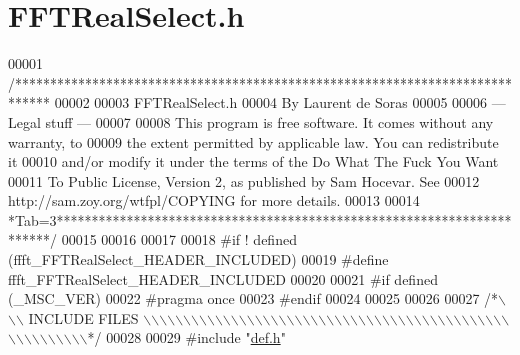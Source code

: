 \hypertarget{a00104_source}{\section{F\+F\+T\+Real\+Select.\+h}
\label{a00104_source}
}

\begin{DoxyCode}
00001 \textcolor{comment}{/*****************************************************************************}
00002 \textcolor{comment}{}
00003 \textcolor{comment}{        FFTRealSelect.h}
00004 \textcolor{comment}{        By Laurent de Soras}
00005 \textcolor{comment}{}
00006 \textcolor{comment}{--- Legal stuff ---}
00007 \textcolor{comment}{}
00008 \textcolor{comment}{This program is free software. It comes without any warranty, to}
00009 \textcolor{comment}{the extent permitted by applicable law. You can redistribute it}
00010 \textcolor{comment}{and/or modify it under the terms of the Do What The Fuck You Want}
00011 \textcolor{comment}{To Public License, Version 2, as published by Sam Hocevar. See}
00012 \textcolor{comment}{http://sam.zoy.org/wtfpl/COPYING for more details.}
00013 \textcolor{comment}{}
00014 \textcolor{comment}{*Tab=3***********************************************************************/}
00015 
00016 
00017 
00018 \textcolor{preprocessor}{#if ! defined (ffft\_FFTRealSelect\_HEADER\_INCLUDED)}
00019 \textcolor{preprocessor}{#define ffft\_FFTRealSelect\_HEADER\_INCLUDED}
00020 
00021 \textcolor{preprocessor}{#if defined (\_MSC\_VER)}
00022 \textcolor{preprocessor}{    #pragma once}
00023 \textcolor{preprocessor}{#endif}
00024 
00025 
00026 
00027 \textcolor{comment}{/*\(\backslash\)\(\backslash\)\(\backslash\) INCLUDE FILES \(\backslash\)\(\backslash\)\(\backslash\)\(\backslash\)\(\backslash\)\(\backslash\)\(\backslash\)\(\backslash\)\(\backslash\)\(\backslash\)\(\backslash\)\(\backslash\)\(\backslash\)\(\backslash\)\(\backslash\)\(\backslash\)\(\backslash\)\(\backslash\)\(\backslash\)\(\backslash\)\(\backslash\)\(\backslash\)\(\backslash\)\(\backslash\)\(\backslash\)\(\backslash\)\(\backslash\)\(\backslash\)\(\backslash\)\(\backslash\)\(\backslash\)\(\backslash\)\(\backslash\)\(\backslash\)\(\backslash\)\(\backslash\)\(\backslash\)\(\backslash\)\(\backslash\)\(\backslash\)\(\backslash\)\(\backslash\)\(\backslash\)\(\backslash\)\(\backslash\)\(\backslash\)\(\backslash\)\(\backslash\)\(\backslash\)\(\backslash\)\(\backslash\)\(\backslash\)\(\backslash\)\(\backslash\)\(\backslash\)\(\backslash\)*/}
00028 
00029 \textcolor{preprocessor}{#include    "\hyperlink{a00089}{def.h}"}

\end{DoxyCode}
